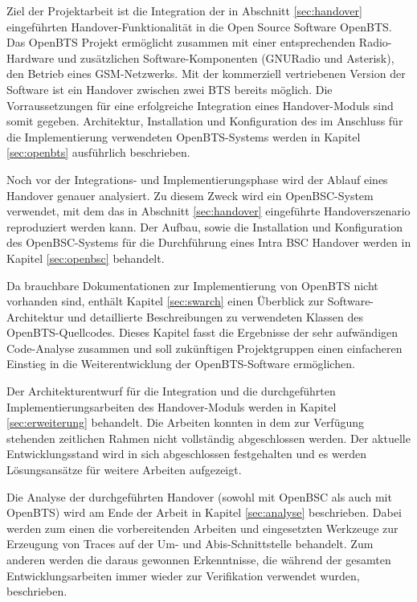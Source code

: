 Ziel der Projektarbeit ist die Integration der in Abschnitt \ref{sec:handover} eingeführten Handover-Funktionalität in die Open Source Software OpenBTS. Das OpenBTS Projekt ermöglicht zusammen mit einer entsprechenden Radio-Hardware und zusätzlichen Software-Komponenten (GNURadio und Asterisk), den Betrieb eines GSM-Netzwerks. Mit der kommerziell vertriebenen Version der Software ist ein Handover zwischen zwei BTS bereits möglich. Die Vorraussetzungen für eine erfolgreiche Integration eines Handover-Moduls sind somit gegeben. Architektur, Installation und Konfiguration des im Anschluss für die Implementierung verwendeten OpenBTS-Systems werden in Kapitel \ref{sec:openbts} ausführlich beschrieben.

Noch vor der Integrations- und Implementierungsphase wird der Ablauf eines Handover genauer analysiert. Zu diesem Zweck wird ein OpenBSC-System verwendet, mit dem das in Abschnitt \ref{sec:handover} eingeführte Handoverszenario reproduziert werden kann. Der Aufbau, sowie die Installation und Konfiguration des OpenBSC-Systems für die Durchführung eines Intra BSC Handover werden in Kapitel \ref{sec:openbsc} behandelt.

Da brauchbare Dokumentationen zur Implementierung von OpenBTS nicht vorhanden sind, enthält Kapitel \ref{sec:swarch} einen Überblick zur Software-Architektur und detaillierte Beschreibungen zu verwendeten Klassen des OpenBTS-Quellcodes. Dieses Kapitel fasst die Ergebnisse der sehr aufwändigen Code-Analyse zusammen und soll zukünftigen Projektgruppen einen einfacheren Einstieg in die Weiterentwicklung der OpenBTS-Software ermöglichen.

Der Architekturentwurf für die Integration und die durchgeführten Implementierungsarbeiten des Handover-Moduls werden in Kapitel \ref{sec:erweiterung} behandelt. Die Arbeiten konnten in dem zur Verfügung stehenden zeitlichen Rahmen nicht vollständig abgeschlossen werden. Der aktuelle Entwicklungsstand wird in sich abgeschlossen festgehalten und es werden Lösungsansätze für weitere Arbeiten aufgezeigt.

Die Analyse der durchgeführten Handover (sowohl mit OpenBSC als auch mit OpenBTS) wird am Ende der Arbeit in Kapitel \ref{sec:analyse} beschrieben. Dabei werden zum einen die vorbereitenden Arbeiten und eingesetzten Werkzeuge zur Erzeugung von Traces auf der Um- und Abis-Schnittstelle behandelt. Zum anderen werden die daraus gewonnen Erkenntnisse, die während der gesamten Entwicklungsarbeiten immer wieder zur Verifikation verwendet wurden, beschrieben.
